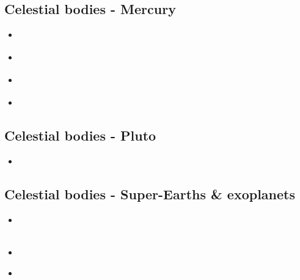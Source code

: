 \subsection{Celestial bodies - Mercury}

\begin{scriptsize}
\begin{itemize}
\item[\twothousandseven] 
\textcite{reki07} 
\item[\twothousandeight] 
\textcite{king08} 
\item[\twothousandtwelve] 
\textcite{roba12}  
\item[\twothousandtwentyone] 
\textcite{gult21} 
\end{itemize}
\end{scriptsize}

\subsection{Celestial bodies - Pluto}

\begin{scriptsize}
\begin{itemize}
\item[\twothousandsixteen] 
\textcite{mcnw16} 
\end{itemize}
\end{scriptsize}

\subsection{Celestial bodies - Super-Earths \& exoplanets}

\begin{scriptsize}
\begin{itemize}
\item[\twothousandeleven]
\textcite{stfl11} \\
\textcite{vata11} \\
\item[\twothousandthirteen]
\textcite{stlh13} \\
\item[\twothousandfifteen] 
\textcite{welo15} \\
\textcite{miko15} \\
\textcite{kamo15} \\
\end{itemize}
\end{scriptsize}

